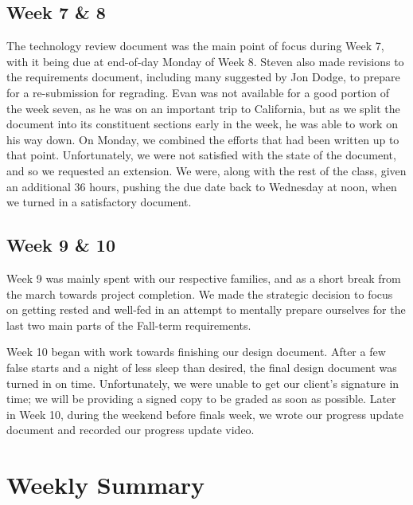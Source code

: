 \documentclass[onecolumn, draftclsnofoot,10pt, compsoc]{IEEEtran}
\begin{document}
\subsection{Week 7 \& 8}
The technology review document was the main point of focus during Week 7, with 
it being due at end-of-day Monday of Week 8. Steven also made revisions to the 
requirements document, including many suggested by Jon Dodge, to prepare for a 
re-submission for regrading. Evan was not available for a good portion of the 
week seven, as he was on an important trip to California, but as we split the 
document into its constituent sections early in the week, he was able to work 
on his way down. On Monday, we combined the efforts that had been written up 
to that point. Unfortunately, we were not satisfied with the state of the 
document, and so we requested an extension. We were, along with the rest of 
the class, given an additional 36 hours, pushing the due date back to Wednesday 
at noon, when we turned in a satisfactory document.


\subsection{Week 9 \& 10}
Week 9 was mainly spent with our respective families, and as a short break from 
the march towards project completion. We made the strategic decision to focus 
on getting rested and well-fed in an attempt to mentally prepare ourselves for 
the last two main parts of the Fall-term requirements. 

Week 10 began with work towards finishing our design document. After a few false 
starts and a night of less sleep than desired, the final design document was turned 
in on time. Unfortunately, we were unable to get our client's signature in time; 
we will be providing a signed copy to be graded as soon as possible. Later in Week 10, 
during the weekend before finals week, we wrote our progress update document and 
recorded our progress update video.


\section{Weekly Summary}
\end{document}
